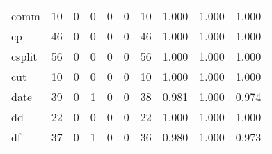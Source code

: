 \begin{longtable}{lp{1.3cm}p{1.3cm}p{1.3cm}p{1.3cm}p{1.3cm}p{1.3cm}p{1.3cm}p{1.3cm}p{1.3cm}}
comm      &                     10 &                                             0 &                                            0 &                                           0 &                                            0 &                                         10 &                                1.000 &                                  1.000 &                                1.000 \\
cp        &                     46 &                                             0 &                                            0 &                                           0 &                                            0 &                                         46 &                                1.000 &                                  1.000 &                                1.000 \\
csplit    &                     56 &                                             0 &                                            0 &                                           0 &                                            0 &                                         56 &                                1.000 &                                  1.000 &                                1.000 \\
cut       &                     10 &                                             0 &                                            0 &                                           0 &                                            0 &                                         10 &                                1.000 &                                  1.000 &                                1.000 \\
date      &                     39 &                                             0 &                                            1 &                                           0 &                                            0 &                                         38 &                                0.981 &                                  1.000 &                                0.974 \\
dd        &                     22 &                                             0 &                                            0 &                                           0 &                                            0 &                                         22 &                                1.000 &                                  1.000 &                                1.000 \\
df        &                     37 &                                             0 &                                            1 &                                           0 &                                            0 &                                         36 &                                0.980 &                                  1.000 &                                0.973 \\

\end{longtable}
